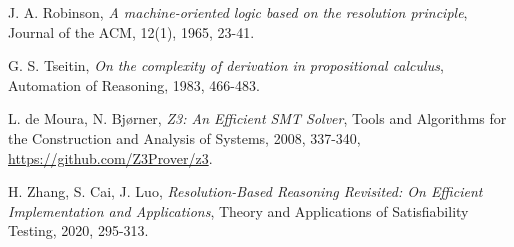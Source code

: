 \documentclass[a4paper,10pt]{article}
\begin{document}
\begin{thebibliography}{10}
J. A. Robinson,
\textit{A machine-oriented logic based on the resolution principle},
Journal of the ACM, 12(1), 1965, 23-41.

G. S. Tseitin,
\textit{On the complexity of derivation in propositional calculus},
Automation of Reasoning, 1983, 466-483.

L. de Moura, N. Bjørner,
\textit{Z3: An Efficient SMT Solver},
Tools and Algorithms for the Construction and Analysis of Systems, 2008, 337-340,
\url{https://github.com/Z3Prover/z3}.

H. Zhang, S. Cai, J. Luo,
\textit{Resolution-Based Reasoning Revisited: On Efficient Implementation and Applications},
Theory and Applications of Satisfiability Testing, 2020, 295-313.

\end{thebibliography}
\end{document}
